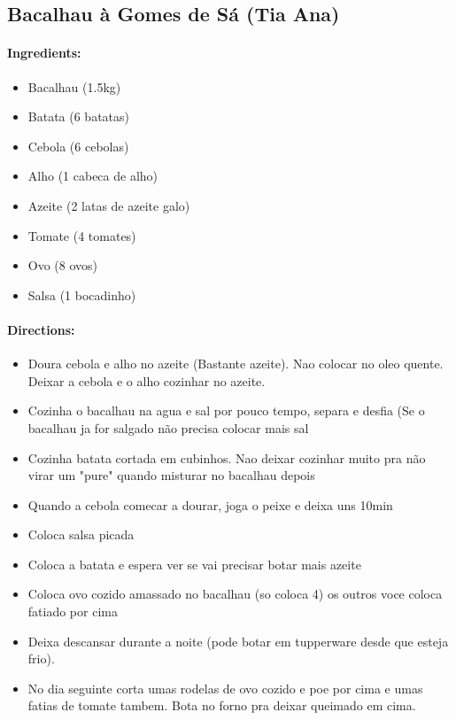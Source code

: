 \documentclass{article}
\begin{document}
\subsection{Bacalhau à Gomes de Sá (Tia Ana)}

\paragraph{Ingredients:}

\begin{itemize}
	\item Bacalhau (1.5kg)
	\item Batata (6 batatas)
	\item Cebola (6 cebolas)
	\item Alho (1 cabeca de alho)
	\item Azeite (2 latas de azeite galo)
	\item Tomate (4 tomates)
	\item Ovo (8 ovos)
	\item Salsa (1 bocadinho)
\end{itemize}

\paragraph{Directions:}
\begin{itemize}
	\item Doura cebola e alho no azeite (Bastante azeite). Nao colocar no oleo quente. Deixar a cebola e o alho cozinhar no azeite.
	\item Cozinha o bacalhau na agua e sal por pouco tempo, separa e desfia (Se o bacalhau ja for salgado não precisa colocar mais sal
	\item Cozinha batata cortada em cubinhos. Nao deixar cozinhar muito pra não virar um "pure" quando misturar no bacalhau depois
	\item Quando a cebola comecar a dourar, joga o peixe e deixa uns 10min
	\item Coloca salsa picada
	\item Coloca a batata e espera ver se vai precisar botar mais azeite
	\item Coloca ovo cozido amassado no bacalhau (so coloca 4) os outros voce coloca fatiado por cima
	\item Deixa descansar durante a noite (pode botar em tupperware desde que esteja frio).
	\item No dia seguinte corta umas rodelas de ovo cozido e poe por cima e umas fatias de tomate tambem. Bota no forno pra deixar  queimado em cima.
\end{itemize}
\end{document}
